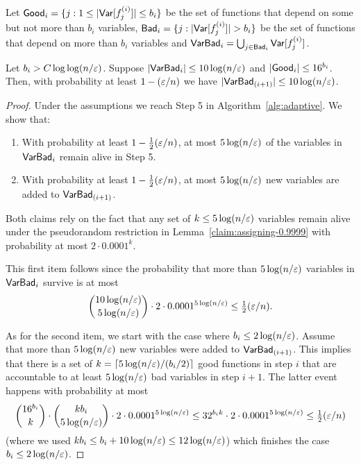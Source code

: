 Let $\mathsf{Good}_i = \{j:  1 \le |\mathsf{Var}[f_j^{(i)}]| \le b_i\}$ be the set of functions that depend on some but not more than $b_i$ variables, $\mathsf{Bad}_i = \{j:  |\mathsf{Var}[f_j^{(i)}]| > b_i\}$ be the set of functions that depend on more than $b_i$ variables
and  $\mathsf{VarBad}_{i} = \bigcup_{j\in \mathsf{Bad}_{i} }{\mathsf{Var}[f_j^{(i)}]}$.

\begin{claim}\label{claim:VBad}
Let $b_i > C\log \log(n/\varepsilon)$.
Suppose $|\mathsf{VarBad}_{i}| \le 10 \log(n/\varepsilon)$ and $|\mathsf{Good}_{i}| \le 16^{b_{i}}$.
Then, with probability at least $1-(\varepsilon/n)$ 
we have $|\mathsf{VarBad}_{(i+1)}| \le 10 \log(n/\varepsilon)$.
\end{claim}
\begin{proof}
Under the assumptions we reach Step 5 in Algorithm~\ref{alg:adaptive}. We show that:
\begin{enumerate}
	\item With probability at least $1-\frac{1}{2}(\varepsilon/n)$, at most $5\log(n/\varepsilon)$ of the variables in $\mathsf{VarBad}_{i}$ remain alive in Step 5.
	\item With probability at least $1-\frac{1}{2}(\varepsilon/n)$, at most $5 \log(n/\varepsilon)$ new variables are added to $\mathsf{VarBad}_{(i+1)}$.
\end{enumerate}
Both claims rely on the fact that  any set of $k \le 5 \log(n/\varepsilon)$ variables remain alive under the pseudorandom restriction in Lemma~\ref{claim:assigning-0.9999} with probability at most $2\cdot 0.0001^k$.


This  first item follows since the probability that more than $5\log(n/\varepsilon)$ variables in $\mathsf{VarBad}_i$ survive is at most 
$$\binom{10\log(n/\varepsilon)}{5\log(n/\varepsilon)} \cdot 2\cdot0.0001^{5\log(n/\varepsilon)} \le \tfrac{1}{2} (\varepsilon/n).$$

As for the second item, we start with the case where $b_i \le 2\log(n/\varepsilon)$.
Assume that more than $5\log(n/\varepsilon)$ new variables were added to $\mathsf{VarBad}_{(i+1)}$. 
This implies that there is a set of $k = \lceil{5\log(n/\varepsilon)/(b_i/2)\rceil}$ good functions in step $i$ that are accountable to at least $5\log(n/\varepsilon)$ bad variables in step $i+1$.
The latter event happens with probability at most 
$$\binom{16^{b_i}}{k} \cdot \binom{k b_i}{5\log(n/\varepsilon)} \cdot 2\cdot 0.0001^{5\log(n/\varepsilon)} \le 32^{b_i k} \cdot 2 \cdot 0.0001^{5\log(n/\varepsilon)} \le \tfrac{1}{2} (\varepsilon/n)$$
(where we used $k b_i \le b_i+10\log(n/\varepsilon) \le 12\log(n/\varepsilon)$)
which finishes the case $b_i \le 2\log(n/\varepsilon)$.


\end{proof}

